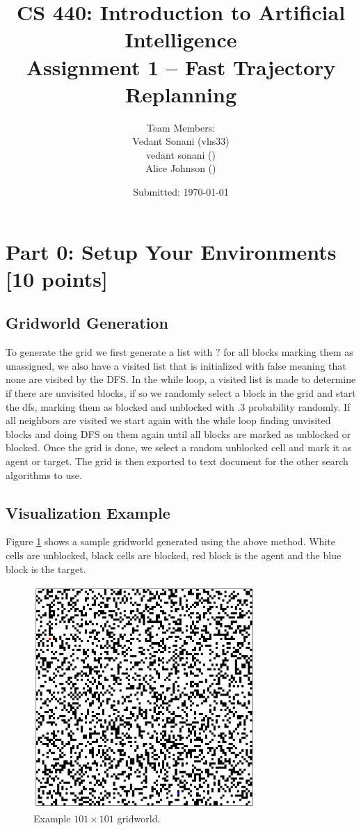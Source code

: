 \documentclass[12pt]{article}
\title{CS 440: Introduction to Artificial Intelligence \\ Assignment 1 -- Fast Trajectory Replanning}
\author{Team Members: \\ 
Vedant Sonani (vhs33) \\ 
vedant sonani (\ruid) \\ 
Alice Johnson (\ruid)}
\date{Submitted: \today}
\begin{document}
\maketitle

\section*{Part 0: Setup Your Environments [10 points]}
\label{sec:part0}

\subsection*{Gridworld Generation}
To generate the grid we first generate a list with $?$ for all blocks marking them as unassigned, we also have a visited list that is initialized with false meaning that none are visited by the DFS. In the while loop, a visited list is made to determine if there are unvisited blocks, if so we randomly select a block in the grid and start the dfs, marking them as blocked and unblocked with .3 probability randomly. If all neighbors are visited we start again with the while loop finding unvisited blocks and doing DFS on them again until all blocks are marked as unblocked or blocked. Once the grid is done, we select a random unblocked cell and mark it as agent or target. The grid is then exported to text document for the other search algorithms to use.

\subsection*{Visualization Example}
Figure \ref{fig:gridworld} shows a sample gridworld generated using the above method. White cells are unblocked, black cells are blocked, red block is the agent and the blue block is the target.

\begin{figure}[ht]
    \centering
    \includegraphics[width=0.75\textwidth]{Figure_1.png}
    \caption{Example \(101 \times 101\) gridworld.}
    \label{fig:gridworld}
\end{figure}
\end{document}
